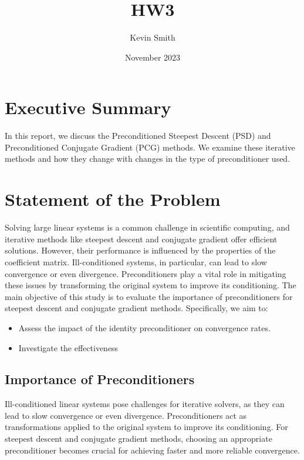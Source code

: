 \documentclass[12pt, letterpaper]{article}
\title{HW3}
\author{Kevin Smith}
\date{November 2023}
\begin{document}
\maketitle
\hspace{-.75cm} 

\section{Executive Summary}

In this report, we discuss the Preconditioned Steepest Descent (PSD) and Preconditioned Conjugate Gradient (PCG) methods. We examine these iterative methods and how they change with changes in the type of preconditioner used.

\section{Statement of the Problem}

Solving large linear systems is a common challenge in scientific computing, and iterative methods like steepest descent and conjugate gradient offer efficient solutions. However, their performance is influenced by the properties of the coefficient matrix. Ill-conditioned systems, in particular, can lead to slow convergence or even divergence. Preconditioners play a vital role in mitigating these issues by transforming the original system to improve its conditioning. The main objective of this study is to evaluate the importance of preconditioners for steepest descent and conjugate gradient methods. Specifically, we aim to:

\begin{itemize}
  \item Assess the impact of the identity preconditioner on convergence rates.
  \item Investigate the effectiveness
\end{itemize}

\subsection*{Importance of Preconditioners}
Ill-conditioned linear systems pose challenges for iterative solvers, as they can lead to slow convergence or even divergence. Preconditioners act as transformations applied to the original system to improve its conditioning. For steepest descent and conjugate gradient methods, choosing an appropriate preconditioner becomes crucial for achieving faster and more reliable convergence.
\end{document}
